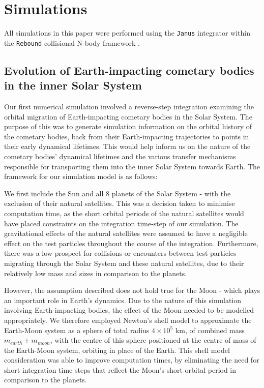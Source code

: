 \chapter{Simulations}
\label{chap:method}

All simulations in this paper were performed using the \texttt{Janus} integrator \citep{2017arXiv170407715R} within the \texttt{Rebound} collisional N-body framework \citep{2012A&A...537A.128R}.

\section{Evolution of Earth-impacting cometary bodies in the inner Solar System}


Our first numerical simulation involved a reverse-step integration examining the orbital migration of Earth-impacting cometary bodies in the Solar System.
The purpose of this was to generate simulation information on the orbital history of the cometary bodies, back from their Earth-impacting trajectories to points in their early dynamical lifetimes. This would help inform us on the nature of the cometary bodies' dynamical lifetimes and the various transfer mechanisms responsible for transporting them into the inner Solar System towards Earth. The framework for our simulation model is as follows:

We first include the Sun and all 8 planets of the Solar System - with the exclusion of their natural satellites. This was a decision taken to minimise computation time, as the short orbital periods of the natural satellites would have placed constraints on the integration time-step of our simulation. The gravitational effects of the natural satellites were assumed to have a negligible effect on the test particles throughout the course of the integration. Furthermore, there was a low prospect for collisions or encounters between test particles migrating through the Solar System and these natural satellites, due to their relatively low mass and sizes in comparison to the planets.

However, the assumption described does not hold true for the Moon - which plays an important role in Earth's dynamics. Due to the nature of this simulation involving Earth-impacting bodies, the effect of the Moon needed to be modelled appropriately. We therefore employed Newton's shell model to approximate the Earth-Moon system as a sphere of total radius $4\times10^5$ km, of combined mass $m_{earth}+m_{moon}$, with the centre of this sphere positioned at the centre of mass of the Earth-Moon system, orbiting in place of the Earth. This shell model consideration was able to improve computation times, by eliminating the need for short integration time steps that reflect the Moon's short orbital period in comparison to the planets.

